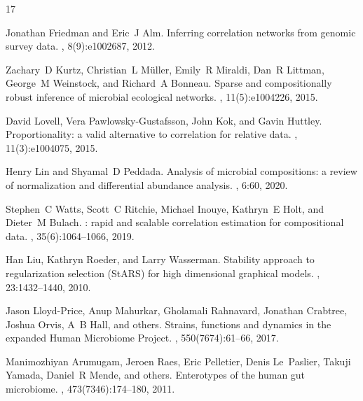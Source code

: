 \documentclass[unnumsec,webpdf,contemporary,large,numbered]{oup-authoring-template}
\theoremstyle{plain}
\theoremstyle{definition}
\begin{document}
\begin{thebibliography}{17}

Jonathan Friedman and Eric~J Alm.
\newblock Inferring correlation networks from genomic survey data.
, 8(9):e1002687, 2012.

Zachary~D Kurtz, Christian~L M{\"u}ller, Emily~R Miraldi, Dan~R Littman, George~M Weinstock, and Richard~A Bonneau.
\newblock Sparse and compositionally robust inference of microbial ecological networks.
, 11(5):e1004226, 2015.

David Lovell, Vera Pawlowsky-Gustafsson, John Kok, and Gavin Huttley.
\newblock Proportionality: a valid alternative to correlation for relative data.
, 11(3):e1004075, 2015.

Henry Lin and Shyamal~D Peddada.
\newblock Analysis of microbial compositions: a review of normalization and differential abundance analysis.
, 6:60, 2020.

Stephen~C Watts, Scott~C Ritchie, Michael Inouye, Kathryn~E Holt, and Dieter~M Bulach.
: rapid and scalable correlation estimation for compositional data.
, 35(6):1064--1066, 2019.

Han Liu, Kathryn Roeder, and Larry Wasserman.
\newblock Stability approach to regularization selection ({StARS}) for high dimensional graphical models.
, 23:1432--1440, 2010.

Jason Lloyd-Price, Anup Mahurkar, Gholamali Rahnavard, Jonathan Crabtree, Joshua Orvis, A~B Hall, and others.
\newblock Strains, functions and dynamics in the expanded {Human Microbiome Project}.
, 550(7674):61--66, 2017.

Manimozhiyan Arumugam, Jeroen Raes, Eric Pelletier, Denis Le~Paslier, Takuji Yamada, Daniel~R Mende, and others.
\newblock Enterotypes of the human gut microbiome.
, 473(7346):174--180, 2011.


\end{thebibliography}
\end{document}
